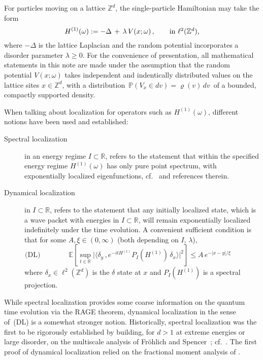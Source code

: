 \documentclass[reqno,keywordsasfootnote]{article}
\numberwithin{equation}{section}
\theoremstyle{definition}
\begin{document}
For particles moving on a lattice $ \mathbb{Z}^d $, the single-particle Hamiltonian may take the form
\begin{equation}\label{eq:defH}
	H^{(1)}(\omega) := - \Delta \, + \, \lambda \, V(x;\omega) \, , \qquad \mbox{in $ \ell^2(\mathbb{Z}^d) $,} 
\end{equation}
where $-\Delta$ is the lattice Laplacian 
and the random potential incorporates a disorder parameter $ \lambda \geq  0 $. 
For the convenience of presentation, all mathematical statements in this note are made under the assumption that the random potential  $ V(x;\omega) $  takes  
 independent and 
indentically distributed values on the lattice sites $ x \in \mathbb{Z}^d $, with a distribution
 $\,  \mathbb{P}(V_x \in dv ) = \varrho(v) \, dv \, $ of a bounded, compactly supported density.
 
 
  
When talking about localization for operators such as $ H^{(1)}(\omega) $, different notions have been used and established:
\begin{description}
\item[Spectral localization] in an energy regime $ I \subset \mathbb{R}$, refers to the statement that within the specified energy regime $  H^{(1)}(\omega) $   has only pure point spectrum, 
with exponentially localized eigenfunctions, cf.~\cite{St00} and references therein.
\item[Dynamical localization] in $ I \subset \mathbb{R}$,   refers to the statement that any initially localized state, which  is a wave packet with energies in $ I \subset \mathbb{R}$, will 
 remain exponentially localized indefinitely under the time evolution.   A convenient sufficient condition is that 
for some $ A,  \xi \in (0, \infty) $ (both depending on $ I $, $ \lambda $), 
\begin{equation*}\label{eq:dynloc}
\mbox{(DL)}\qquad\qquad  \mathbb{E}\left[\sup_{t\in \mathbb{R}} \big| \langle \delta_y \, , e^{-itH^{(1)}} P_I(H^{(1)})\, \delta_x \rangle \big|^2\right] \leq A \, e^{-|x-y|/\xi} 
	\qquad\qquad 
\end{equation*}
where $ \delta_x \in \ell^2(\mathbb{Z}^d) $  is the  $\delta$ state at $ x  $ and $ P_I(H^{(1)})  $ is a  spectral projection. 
\end{description}
While spectral localization provides some coarse information on the quantum time evolution via the RAGE theorem, dynamical localization in the sense of~(DL) is a somewhat stronger notion.   
Historically,  spectral localization was the first to be rigorously established by building, for $d>1$ at  extreme energies or large disorder, 
on the multiscale analysis of Fr\"ohlich and Spencer~\cite{FrSp83}; cf.~\cite{St00,Kis}.  
The first proof of dynamical localization \cite{A2} relied on the fractional moment analysis of \cite{AM}. 
\end{document}
